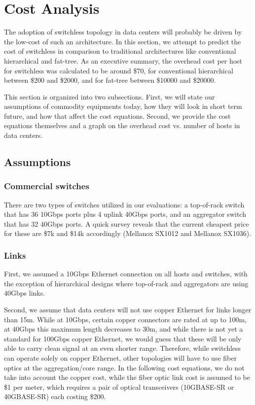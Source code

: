 \vspace{-0.1in}
\section{Cost Analysis}
\label{sec:cost_model}

The adoption of switchless topology in data centers will probably be driven by the low-cost of such an architecture. In this section, we attempt to predict the cost of switchless in comparison to traditional architectures like conventional hierarchical and fat-tree. As an executive summary, the overhead cost per host for switchless was calculated to be around \$70, for conventional hierarchical between \$200 and \$2000, and for fat-tree between \$10000 and \$20000.

This section is organized into two subsections. First, we will state our assumptions of commodity equipments today, how they will look in short term future, and how that affect the cost equations. Second, we provide the cost equations themselves and a graph on the overhead cost vs. number of hosts in data centers.
\vspace{-0.1in}
\subsection{Assumptions}


\subsubsection{Commercial switches}

There are two types of switches utilized in our evaluations: a top-of-rack switch that has 36 10Gbps ports plus 4 uplink 40Gbps ports, and an aggregator switch that has 32 40Gbps ports. A quick survey reveals that the current cheapest price for these are \$7k and \$14k accordingly (Mellanox SX1012 and Mellanox SX1036).

\subsubsection{Links}
First, we assumed a 10Gbps Ethernet connection on all hosts and switches, with the exception of hierarchical designs where top-of-rack and aggregators are using 40Gbps links.

Second, we assume that data centers will not use copper Ethernet for links longer than 15m. While at 10Gbps, certain copper connectors are rated at up to 100m, at 40Gbps this maximum length decreases to 30m, and while there is not yet a standard for 100Gbps copper Ethernet, we would guess that these will be only able to carry clean signal at an even shorter range. Therefore, while switchless can operate solely on copper Ethernet, other topologies will have to use fiber optics at the aggregation/core range. In the following cost equations, we do not take into account the copper cost, while the fiber optic link cost is assumed to be \$1 per meter, which requires a pair of optical transceivers (10GBASE-SR or 40GBASE-SR) each costing \$200.

